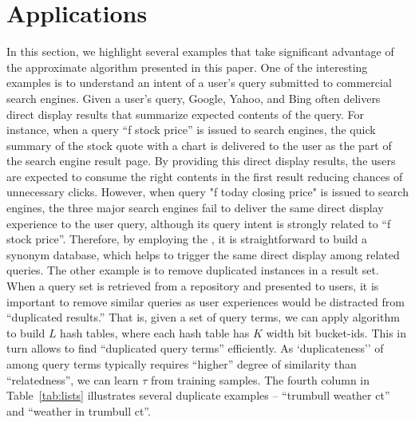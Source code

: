 \section{Applications}
In this section, we highlight several examples that take significant advantage of  the approximate \dflip algorithm presented in this paper.
One of the interesting examples is to understand an intent of a user's query submitted to commercial search engines. Given a user's query,
Google, Yahoo, and Bing often delivers direct display results that summarize expected contents of the query. 
For instance, when a query ``f stock price'' is issued  to search engines, the quick summary of the stock quote with a chart is delivered 
to the user as the part of the search engine result page. By providing this direct display results, the users are expected to consume the right contents
in the first result reducing chances of unnecessary clicks. However, when query "f today closing price" is issued to search engines, the three major search engines 
fail to deliver the same direct display experience to the user query, although its query intent is strongly related to ``f stock price''. 
Therefore, by employing the \dflip, it is straightforward to build a synonym database, which helps to trigger the same direct display among related queries.
The other example is to remove duplicated instances in a result set. 
When a query set is retrieved from a repository and presented to users, it is important to remove similar queries as user experiences would be distracted from ``duplicated results.'' That is, given a set of query terms, we can apply  \dflip algorithm to build $L$ hash tables, where each hash table has $K$ width bit bucket-ids. This in turn allows to find ``duplicated query terms'' efficiently. As `duplicateness'' of among query terms typically requires ``higher'' degree of similarity than ``relatedness'', we can learn $\tau$ from training samples.  The fourth column in Table~\ref{tab:lists} illustrates several duplicate examples -- ``trumbull weather ct'' and ``weather in trumbull ct''.
